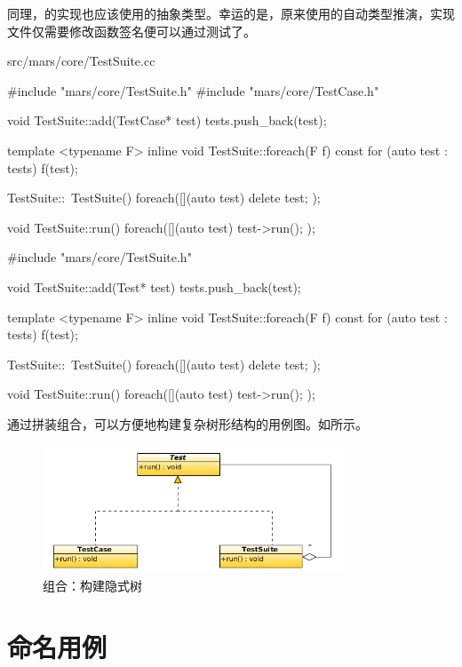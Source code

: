 \begin{content}
同理，的实现也应该使用的抽象类型。幸运的是，原来使用的自动类型推演，实现文件仅需要修改函数签名便可以通过测试了。

\begin{diff}{src/mars/core/TestSuite.cc}
 \begin{minicpp}
#include "mars/core/TestSuite.h"
#include "mars/core/TestCase.h"

void TestSuite::add(TestCase* test) {
  tests.push_back(test);
}

template <typename F>
inline void TestSuite::foreach(F f) const {
  for (auto test : tests) {
    f(test);
  }
}

TestSuite::~TestSuite() {
  foreach([](auto test) {
    delete test;
  });
}

void TestSuite::run() {
  foreach([](auto test) {
    test->run();
  });
} 
 \end{minicpp}
\tcblower
 \begin{minicpp}
#include "mars/core/TestSuite.h"

void TestSuite::add(Test* test) {
  tests.push_back(test);
}

template <typename F>
inline void TestSuite::foreach(F f) const {
  for (auto test : tests) {
    f(test);
  }
}

TestSuite::~TestSuite() {
  foreach([](auto test) {
    delete test;
  });
}

void TestSuite::run() {
  foreach([](auto test) {
    test->run();
  });
}
 \end{minicpp}
\end{diff}

通过拼装组合，可以方便地构建复杂树形结构的用例图。如所示。

\begin{figure}
\centering
\includegraphics[width=0.8\textwidth]{figures/xunit/test-tree.png}
\caption{组合：构建隐式树}
 \label{fig:test-tree}
\end{figure}

\section{命名用例}


\end{content}
